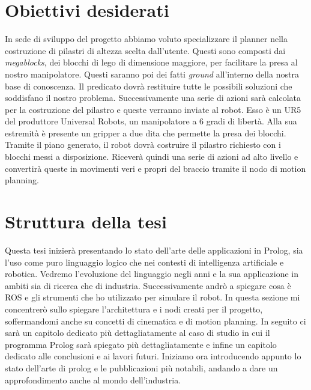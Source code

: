 \section{Obiettivi desiderati}
\label{sec:obiettdes}
In sede di sviluppo del progetto abbiamo voluto specializzare il planner nella costruzione di pilastri di altezza scelta dall'utente. Questi sono 
composti dai \textit{megablocks}, dei blocchi di lego di dimensione maggiore, per facilitare la presa al nostro manipolatore. Questi saranno poi dei 
fatti \textit{ground} all'interno della nostra base di conoscenza. Il predicato dovrà restituire tutte le possibili soluzioni che
soddisfano il nostro problema. Successivamente una serie di azioni sarà calcolata per la costruzione del pilastro e queste verranno inviate al robot. Esso è un UR5
del produttore Universal Robots, un manipolatore a 6 gradi di libertà. Alla sua estremità è presente un gripper a due dita che permette la presa dei blocchi.
Tramite il piano generato, il robot dovrà costruire il pilastro richiesto con i blocchi messi a disposizione. Riceverà quindi una serie di azioni ad alto
livello e convertirà queste in movimenti veri e propri del braccio tramite il nodo di motion planning.

\section{Struttura della tesi}
\label{sec:struttura}
Questa tesi inizierà presentando lo stato dell'arte delle applicazioni in Prolog, sia l'uso come puro linguaggio logico che nei contesti di
intelligenza artificiale e robotica. Vedremo l'evoluzione del linguaggio negli anni e la sua applicazione in ambiti sia di ricerca che di industria.
Successivamente andrò a spiegare cosa è ROS e gli strumenti che ho utilizzato per simulare il robot. In questa sezione mi concentrerò sullo spiegare
l'architettura e i nodi creati per il progetto, soffermandomi anche su concetti di cinematica e di motion planning.
In seguito ci sarà un capitolo dedicato più dettagliatamente al caso di studio in cui il programma Prolog sarà spiegato più
dettagliatamente e infine un capitolo dedicato alle conclusioni e ai lavori futuri.
\newpage Iniziamo ora introducendo appunto lo stato dell'arte di prolog e le pubblicazioni più notabili, andando a dare un approfondimento anche al mondo dell'industria.

